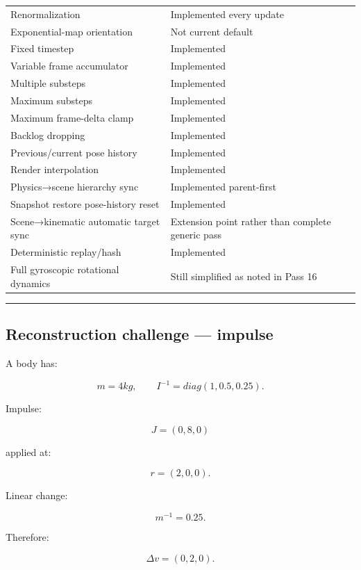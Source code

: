 {\begin{longtable}[]{@{}
  >{\raggedright\arraybackslash}p{}
  >{\raggedright\arraybackslash}p{}@{}}
Renormalization & Implemented every update \\
Exponential-map orientation & Not current default \\
Fixed timestep & Implemented \\
Variable frame accumulator & Implemented \\
Multiple substeps & Implemented \\
Maximum substeps & Implemented \\
Maximum frame-delta clamp & Implemented \\
Backlog dropping & Implemented \\
Previous/current pose history & Implemented \\
Render interpolation & Implemented \\
Physics→scene hierarchy sync & Implemented parent-first \\
Snapshot restore pose-history reset & Implemented \\
Scene→kinematic automatic target sync & Extension point rather than complete generic pass \\
Deterministic replay/hash & Implemented \\
Full gyroscopic rotational dynamics & Still simplified as noted in Pass 16 \\
\end{longtable}
}

\begin{center}\rule{0.5\linewidth}{0.5pt}\end{center}

\subsection{Reconstruction challenge --- impulse}\label{06-engine-ii-ch038-reconstruction-challenge-impulse}

\hypertarget{06-engine-ii-ch038-reconstruction-challenge-impulse}{}

A body has:

\[
m=4kg,
\qquad
I^{-1}
=
diag(1,0.5,0.25).
\]

Impulse:

\[
J=(0,8,0)
\]

applied at:

\[
r=(2,0,0).
\]

Linear change:

\[
m^{-1}=0.25.
\]

Therefore:

\[
\Delta v
=
(0,2,0).
\]

